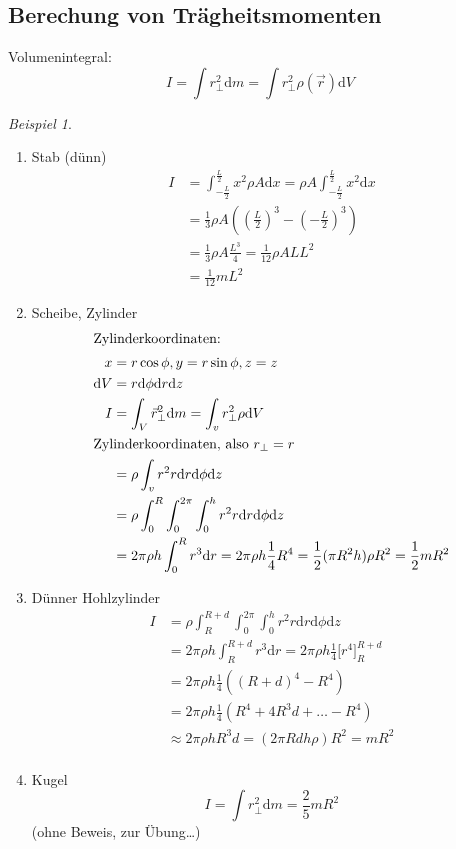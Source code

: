 \documentclass[a4paper]{scrartcl}
\renewcommand{\d}{\mathrm{d}}
\renewcommand{\v}[1]{\vec{#1}}
\theoremstyle{definition}
\theoremstyle{plain}
\theoremstyle{plain}
\theoremstyle{remark}
\theoremstyle{remark}
\theoremstyle{remark}
\newtheorem{ex}{Beispiel}
\begin{document}
\subsection{Berechung von Trägheitsmomenten}
\label{sec-8-5}
Volumenintegral:
\[I = \int r_\perp^2 \d m = \int r_{\perp}^2 \rho(\v r) \d V\]
\begin{ex}
\begin{enumerate}
\item Stab (dünn)
\begin{align*}
I &= \int_{-\frac{L}{2}}^{\frac{L}{2}} x^2 \rho A \d x = \rho A \int_{-\frac{L}{2}}^{\frac{L}{2}} x^2 \d x \\
&= \frac{1}{3} \rho A ((\frac{L}{2})^3 - (- \frac{L}{2})^3) \\
&= \frac{1}{3} \rho A \frac{L^3}{4} = \frac{1}{12} \rho AL L^2 \\
&= \frac{1}{12} m L^2
\end{align*}
\item Scheibe, Zylinder
\begin{align*}
\intertext{Zylinderkoordinaten:}
x &= r \cos{\phi}, y = r\sin{\phi}, z = z \\
\d V &= r\d \phi \d r \d z \\
I &= \int_V \v r_\perp^2 \d m = \int_v r_\perp^2 \rho \d V \\
\intertext{Zylinderkoordinaten, also $r_\perp = r$}
&= \rho \int_v r^2 r \d r \d \phi \d z \\
&= \rho \int_{0}^{R} \int_{0}^{2\pi}\int_{0}^{h} r^2 r \d r \d \phi \d z \\
&= 2\pi \rho h \int_{0}^{R} r^3 \d r = 2 \pi \rho h \frac{1}{4} R^4 = \frac{1}{2} (\pi R^2 h) \rho R^2 = \frac{1}{2} m R^2 \\
\end{align*}
\item Dünner Hohlzylinder
\begin{align*}
I &= \rho \int_{R}^{R + d} \int_{0}^{2\pi} \int_{0}^{h} r^2 r \d r \d \phi \d z \\
&= 2\pi \rho h \int_{R}^{R + d} r^3 \d r = 2\pi \rho h \frac{1}{4} \Big[ r^4 \Big]_R^{R + d} \\
&= 2\pi \rho h \frac{1}{4} ((R + d)^4 - R^4) \\
&= 2\pi \rho h \frac{1}{4} (R^4 + 4 R^3 d + \ldots - R^4) \\
&\approx 2\pi \rho h R^3 d = (2 \pi Rdh \rho)R^2 = mR^2 \\
\end{align*}
\item Kugel
\[I = \int r_{\perp}^2 \d m = \frac{2}{5} m R^2\]
(ohne Beweis,  zur Übung\ldots{})
\end{enumerate}
\end{ex}
\end{document}
